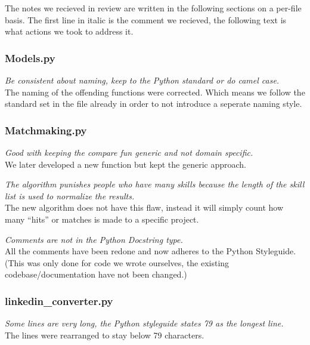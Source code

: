 The notes we recieved in review are written in the following sections on a per-file basis.
The first line in italic is the comment we recieved, the following text is what actions we took to address it.

\subsubsection{Models.py}
\begin{itemize*}
    \item \textit{Be consistent about naming, keep to the Python standard or do camel case.}\\
          The naming of the offending functions were corrected. Which means we follow the standard set in the file already in order to not introduce a seperate naming style.
\end{itemize*}


\subsubsection{Matchmaking.py}
\begin{itemize*}
    \item \textit{Good with keeping the compare fun generic and not domain specific.}\\
          We later developed a new function but kept the generic approach.
    \item \textit{The algorithm punishes people who have many skills because the length of the skill list is used to normalize the results.}\\
          The new algorithm does not have this flaw, instead it will simply count how many ``hits'' or matches is made to a specific project.
    \item \textit{Comments are not in the Python Docstring type.}\\
          All the comments have been redone and now adheres to the Python Styleguide. (This was only done for code we wrote ourselves, the existing codebase/documentation have not been changed.)
\end{itemize*}


\subsubsection{linkedin\_converter.py}
\begin{itemize*}
    \item \textit{Some lines are very long, the Python styleguide states 79 as the longest line.}\\
          The lines were rearranged to stay below 79 characters.
\end{itemize*}

